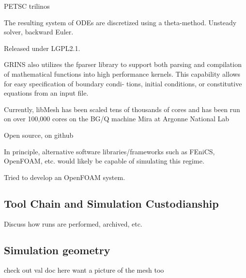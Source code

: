 PETSC\cite{petsc} trilinos\cite{trilinos}

The resulting system of ODEs are discretized using a theta-method. 
Unsteady solver, backward Euler. 

Released under LGPL2.1\cite{lgpl}. 

GRINS also utilizes the fparser\cite{fparser}
library to support both parsing and compilation of mathematical functions into high
performance kernels. This capability allows for easy specification of boundary condi-
tions, initial conditions, or constitutive equations from an input file.

Currently, libMesh has been scaled tens of thousands of cores and has
been run on over 100,000 cores on the BG/Q machine Mira at Argonne National
Lab\cite{libmesh-scaling}

Open source, on github\cite{github}

In principle, alternative software libraries/frameworks such as FEniCS\cite{fenics},
OpenFOAM\cite{openfoam}, etc. would likely be capable of simulating this
regime. 

Tried to develop an OpenFOAM system.   

\subsection{Tool Chain and Simulation Custodianship}

Discuss how runs are performed, archived, etc. 

\subsection{Simulation geometry}

check out val doc here
want a picture of the mesh too
